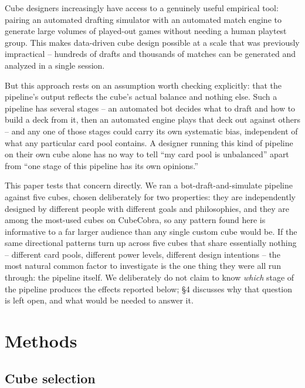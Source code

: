 \documentclass[11pt]{article}
\begin{document}
Cube designers increasingly have access to a genuinely useful empirical tool:
pairing an automated drafting simulator with an automated match engine to
generate large volumes of played-out games without needing a human playtest
group. This makes data-driven cube design possible at a scale that was previously
impractical -- hundreds of drafts and thousands of matches can be generated and
analyzed in a single session.

But this approach rests on an assumption worth checking explicitly: that the
pipeline's output reflects the cube's actual balance and nothing else. Such a
pipeline has several stages -- an automated bot decides what to draft and how to
build a deck from it, then an automated engine plays that deck out against
others -- and any one of those stages could carry its own systematic bias,
independent of what any particular card pool contains. A designer running this
kind of pipeline on their own cube alone has no way to tell ``my card pool is
unbalanced'' apart from ``one stage of this pipeline has its own opinions.''

This paper tests that concern directly. We ran a bot-draft-and-simulate pipeline
against five cubes, chosen deliberately for two properties: they are
independently designed by different people with different goals and philosophies,
and they are among the most-used cubes on CubeCobra, so any pattern found here is
informative to a far larger audience than any single custom cube would be. If the
same directional patterns turn up across five cubes that share essentially
nothing -- different card pools, different power levels, different design
intentions -- the most natural common factor to investigate is the one thing
they were all run through: the pipeline itself. We deliberately do not claim to
know \emph{which} stage of the pipeline produces the effects reported below;
\S4 discusses why that
question is left open, and what would be needed to answer it.

\section{Methods}

\subsection{Cube selection}
\end{document}
